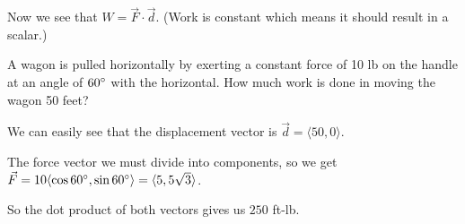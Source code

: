 \documentclass[../calc3.tex]{subfiles}
\begin{document}
Now we see that $W=\vec{F}\cdot \vec{d}$. (Work is constant which means it should result in a scalar.)

\begin{example}
    A wagon is pulled horizontally by exerting a constant force of 10 lb on the handle at an angle of $60\degree$ with the horizontal. How much work is done in moving the wagon 50 feet?

    We can easily see that the displacement vector is $\vec{d}=\langle 50,0\rangle$.

    The force vector we must divide into components, so we get $\vec{F}=10\langle \cos 60\degree, \sin 60\degree\rangle = \langle 5,5\sqrt{3}\rangle$.

    So the dot product of both vectors gives us $250$ ft-lb.
\end{example}
\end{document}
